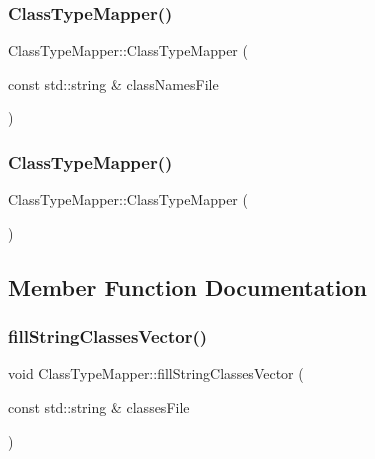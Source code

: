 \subsubsection{\texorpdfstring{Class\+Type\+Mapper()}{ClassTypeMapper()}\hspace{0.1cm}{\footnotesize\ttfamily [1/2]}}
{\footnotesize\ttfamily Class\+Type\+Mapper\+::\+Class\+Type\+Mapper (\begin{DoxyParamCaption}\item[{const std\+::string \&}]{class\+Names\+File }\end{DoxyParamCaption})}

\mbox{\label{struct_class_type_mapper_a4b16c84f275540ed654841dc7a33484a}} 
\subsubsection{\texorpdfstring{Class\+Type\+Mapper()}{ClassTypeMapper()}\hspace{0.1cm}{\footnotesize\ttfamily [2/2]}}
{\footnotesize\ttfamily Class\+Type\+Mapper\+::\+Class\+Type\+Mapper (\begin{DoxyParamCaption}{ }\end{DoxyParamCaption})}



\subsection{Member Function Documentation}
\mbox{\label{struct_class_type_mapper_a999c63158f2d0093de9d60734e6605fb}} 
\subsubsection{\texorpdfstring{fill\+String\+Classes\+Vector()}{fillStringClassesVector()}}
{\footnotesize\ttfamily void Class\+Type\+Mapper\+::fill\+String\+Classes\+Vector (\begin{DoxyParamCaption}\item[{const std\+::string \&}]{classes\+File }\end{DoxyParamCaption})}

